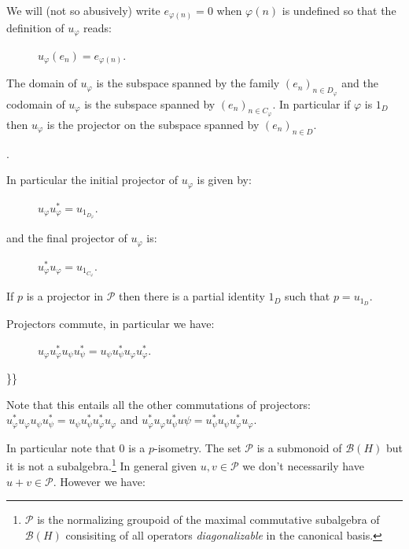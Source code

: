 We will (not so abusively) write \(e_{\varphi(n)} = 0\) when
\(\varphi(n)\) is undefined so that the definition of \(u_\varphi\)
reads:

\begin{description}
\item[]
\(u_\varphi(e_n) = e_{\varphi(n)}\).
\end{description}

The domain of \(u_\varphi\) is the subspace spanned by the family
\((e_n)_{n\in D_\varphi}\) and the codomain of \(u_\varphi\) is the
subspace spanned by \((e_n)_{n\in C_\varphi}\). In particular if
\(\varphi\) is \(1_D\) then \(u_\varphi\) is the projector on the
subspace spanned by \((e_n)_{n\in D}\).

.

In particular the initial projector of \(u_{\varphi}\) is given by:

\begin{description}
\item[]
\(u_\varphi u^*_\varphi = u_{1_{D_\varphi}}\).
\end{description}

and the final projector of \(u_\varphi\) is:

\begin{description}
\item[]
\(u^*_\varphi u_\varphi = u_{1_{C_\varphi}}\).
\end{description}

If \(p\) is a projector in \(\mathcal{P}\) then there is a partial
identity \(1_D\) such that \(p= u_{1_D}\).

Projectors commute, in particular we have:

\begin{description}
\item[]
\(u_\varphi u_\varphi^*u_\psi u_\psi^* = u_\psi u_\psi^*u_\varphi u_\varphi^*\).
\end{description}

\}\}

Note that this entails all the other commutations of projectors:
\(u^*_\varphi u_\varphi u_\psi u^*_\psi = u_\psi u^*_\psi u^*_\varphi u_\varphi\)
and
\(u^*_\varphi u_\varphi u^*_\psi u\psi = u^*_\psi u_\psi u^*_\varphi u_\varphi\).

In particular note that \(0\) is a \(p\)-isometry. The set
\(\mathcal{P}\) is a submonoid of \(\mathcal{B}(H)\) but it is not a
subalgebra.\footnote{\(\mathcal{P}\) is the normalizing groupoid of the
  maximal commutative subalgebra of \(\mathcal{B}(H)\) consisiting of
  all operators \emph{diagonalizable} in the canonical basis.}
In general given \(u,v\in\mathcal{P}\) we don't necessarily have
\(u+v\in\mathcal{P}\). However we have:

